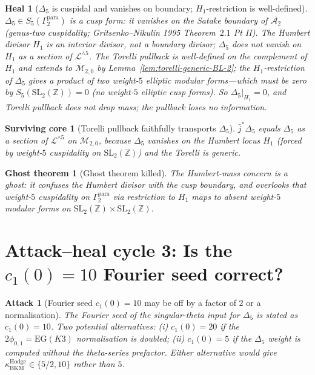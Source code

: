 \documentclass[11pt]{article}
\newtheorem{attack}[theorem]{Attack}
\newtheorem{heal}[theorem]{Heal}
\newtheorem{surviving}[theorem]{Surviving core}
\newtheorem{ghost}[theorem]{Ghost theorem}
\providecommand{\cA}{\mathcal{A}}
\providecommand{\cL}{\mathcal{L}}
\providecommand{\ZZ}{\mathbb{Z}}
\providecommand{\kHodge}{\kappa_{\mathrm{BKM}}^{\mathrm{Hodge}}}
\providecommand{\Mbar}{\overline{\mathcal M}}
\begin{document}
\begin{heal}[$\Delta_5$ is cuspidal and vanishes on boundary; $H_1$-restriction is well-defined]
\label{heal:humbert-mass-BL-2}
$\Delta_5 \in S_5(\Gamma_2^{\mathrm{para}})$ is a cusp form: it vanishes
on the Satake boundary of $\overline{\cA_2}$ (genus-two cuspidality;
Gritsenko--Nikulin 1995 Theorem~$2.1$ Pt II). The Humbert divisor
$H_1$ is an interior divisor, not a boundary divisor; $\Delta_5$ does
\emph{not} vanish on $H_1$ as a section of $\cL^{\wedge 5}$. The
Torelli pullback is well-defined on the complement of $H_1$ and
extends to $\Mbar_{2, 0}$ by Lemma~\ref{lem:torelli-generic-BL-2};
the $H_1$-restriction of $\Delta_5$ gives a product of two
weight-$5$ elliptic modular forms---which must be zero by
$S_5(\mathrm{SL}_2(\ZZ)) = 0$ (no weight-$5$ elliptic cusp forms).
So $\Delta_5|_{H_1} = 0$, and Torelli pullback does \emph{not} drop
mass; the pullback loses no information.
\end{heal}

\begin{surviving}[Torelli pullback faithfully transports $\Delta_5$]
\label{surv:torelli-faithful-BL-2}
$\bar j^* \Delta_5$ equals $\Delta_5$ as a section of $\cL^{\wedge 5}$
on $\Mbar_{2, 0}$, because $\Delta_5$ vanishes on the Humbert locus
$H_1$ (forced by weight-$5$ cuspidality on $\mathrm{SL}_2(\ZZ)$) and
the Torelli is generic.
\end{surviving}

\begin{ghost}[Ghost theorem killed]
\label{ghost:humbert-mass-BL-2}
The Humbert-mass concern is a ghost: it confuses the Humbert
\emph{divisor} with the cusp \emph{boundary}, and overlooks that
weight-$5$ cuspidality on $\Gamma_2^{\mathrm{para}}$ via restriction
to $H_1$ maps to absent weight-$5$ modular forms on
$\mathrm{SL}_2(\ZZ) \times \mathrm{SL}_2(\ZZ)$.
\end{ghost}

\section{Attack--heal cycle 3: Is the $c_1(0) = 10$ Fourier seed correct?}
\label{sec:attack-cycle-3}

\begin{attack}[Fourier seed $c_1(0) = 10$ may be off by a factor of $2$ or a normalisation]
\label{att:fourier-seed-BL-2}
The Fourier seed of the singular-theta input for $\Delta_5$ is stated
as $c_1(0) = 10$. Two potential alternatives:
(i) $c_1(0) = 20$ if the $2\phi_{0, 1} = \mathrm{EG}(K3)$ normalisation
is doubled; (ii) $c_1(0) = 5$ if the $\Delta_5$ weight is computed
without the theta-series prefactor. Either alternative would give
$\kHodge \in \{5/2, 10\}$ rather than $5$.
\end{attack}
\end{document}
